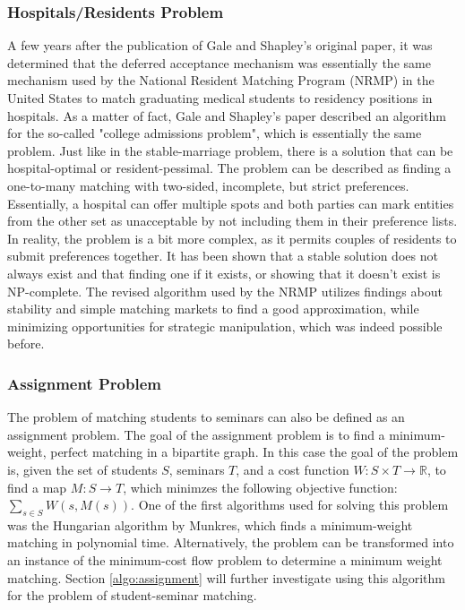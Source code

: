 \subsubsection{Hospitals/Residents Problem}\label{intro:hospital-residents}
A few years after the publication of Gale and Shapley's original paper, it was determined that the deferred acceptance mechanism was essentially the same mechanism used by the National Resident Matching Program (NRMP) in the United States to match graduating medical students to residency positions in hospitals.\cite{Gusfield} As a matter of fact, Gale and Shapley's paper described an algorithm for the so-called "college admissions problem"\cite{GaleShapleyOrig}, which is essentially the same problem. Just like in the stable-marriage problem, there is a solution that can be hospital-optimal or resident-pessimal. 
\newline
The problem can be described as finding a one-to-many matching with two-sided, incomplete, but strict preferences. Essentially, a hospital can offer multiple spots and both parties can mark entities from the other set as unacceptable by not including them in their preference lists.\cite{RePEc:ris:nobelp:2012_005} 
\newline
In reality, the problem is a bit more complex, as it permits couples of residents to submit preferences together. It has been shown that a stable solution does not always exist and that finding one if it exists, or showing that it doesn't exist is NP-complete.\cite{RONN1990285} The revised algorithm used by the NRMP utilizes findings about stability and simple matching markets to find a good approximation, while minimizing opportunities for strategic manipulation, which was indeed possible before.\cite{NBERw6963}

\subsubsection{Assignment Problem}\label{intro_assignment}
The problem of matching students to seminars can also be defined as an assignment problem. The goal of the assignment problem is to find a minimum-weight, perfect matching in a bipartite graph. In this case the goal of the problem is, given the set of students $S$, seminars $T$, and a cost function $W: S \times T \rightarrow \mathbb{R}$, to find a map $M: S \rightarrow T$, which minimzes the following objective function:
$\sum_{s \in S} W(s, M(s))$.
\newline
One of the first algorithms used for solving this problem was the Hungarian algorithm by Munkres, which finds a minimum-weight matching in polynomial time.\cite{Munkres} 
\newline
Alternatively, the problem can be transformed into an instance of the minimum-cost flow problem to determine a minimum weight matching. Section \ref{algo:assignment} will further investigate using this algorithm for the problem of student-seminar matching.

